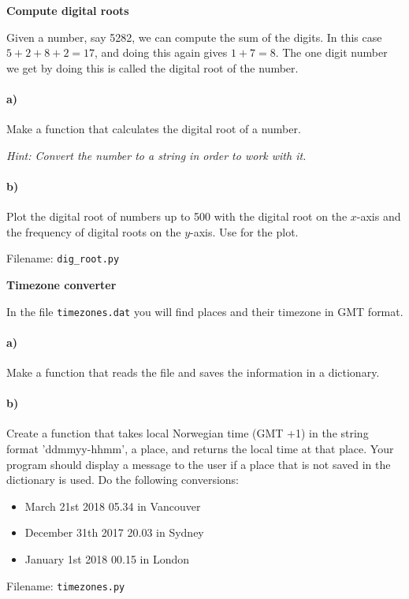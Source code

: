 \begin{Problem}{\textbf{Compute digital roots}}

\noindent Given a number, say 5282, we can compute the sum of the digits. In this case
$5+2+8+2=17$, and doing this again gives $1+7=8$. The one digit number we get by
doing this is called the digital root of the number.

\paragraph{a)}
Make a function that calculates the digital root of a number. 

\emph{Hint: Convert the number to a string in order to work with it.}

\paragraph{b)}
Plot the digital root of numbers up to 500 with the digital root on the $x$-axis and
the frequency of digital roots on the $y$-axis. Use  for the plot.

Filename: \texttt{dig\_root.py}
\end{Problem}



\begin{Problem}{\textbf{Timezone converter}}

\noindent In the file \texttt{timezones.dat} you will find places and their timezone in
GMT format.

\paragraph{a)}
Make a function that reads the file and saves the information in a dictionary.

\paragraph{b)}
Create a function that takes local Norwegian time (GMT +1) in the string format
'ddmmyy-hhmm', a place, and returns the local time at that place. Your program
should display a message to the user if a place that is not saved in the
dictionary is used. Do the following conversions:
\begin{itemize}
    \item March 21st 2018 05.34 in Vancouver
    \item December 31th 2017 20.03 in Sydney
    \item January 1st 2018 00.15 in London
\end{itemize}

Filename: \texttt{timezones.py}
\end{Problem} 

